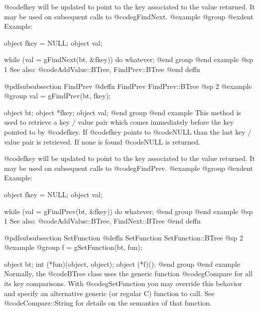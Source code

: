 @code{fkey} will be updated to point to the key associated to the value
returned.  It may be used on subsequent calls to @code{gFindNext}.
@example
@group
@exdent Example:

object  fkey = NULL;
object  val;

while (val = gFindNext(bt, &fkey))
     do whatever;
@end group
@end example
@sp 1
See also:  @code{AddValue::BTree, FindPrev::BTree}
@end deffn





















@pdfsubsubsection {FindPrev}
@deffn {FindPrev} FindPrev::BTree
@sp 2
@example
@group
val = gFindPrev(bt, fkey);

object  bt;
object  *fkey;
object  val;
@end group
@end example
This method is used to retrieve a key / value pair which comes
immediately before the key pointed to by @code{fkey}.  If @code{fkey}
points to @code{NULL} than the last key / value pair is retrieved.  If
none is found @code{NULL} is returned.

@code{fkey} will be updated to point to the key associated to the value
returned.  It may be used on subsequent calls to @code{gFindPrev}.
@example
@group
@exdent Example:

object  fkey = NULL;
object  val;

while (val = gFindPrev(bt, &fkey))
     do whatever;
@end group
@end example
@sp 1
See also:  @code{AddValue::BTree, FindNext::BTree}
@end deffn














@pdfsubsubsection {SetFunction}
@deffn {SetFunction} SetFunction::BTree
@sp 2
@example
@group
f = gSetFunction(bt, fun);

object  bt;
int     (*fun)(object, object);
object  (*f)();
@end group
@end example
Normally, the @code{BTree} class uses the generic function
@code{gCompare} for all its key comparisons.  With @code{gSetFunction}
you may override this behavior and specify an alternative generic (or
regular C) function to call.  See @code{Compare::String} for details
on the semantics of that function.

